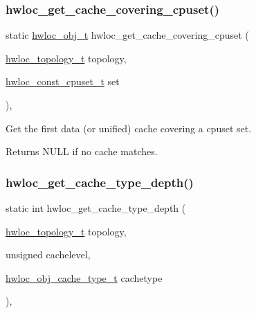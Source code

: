 \subsubsection{\texorpdfstring{hwloc\+\_\+get\+\_\+cache\+\_\+covering\+\_\+cpuset()}{hwloc\_get\_cache\_covering\_cpuset()}}
{\footnotesize\ttfamily static \hyperlink{a00185_ga79b8ab56877ef99ac59b833203391c7d}{hwloc\+\_\+obj\+\_\+t} hwloc\+\_\+get\+\_\+cache\+\_\+covering\+\_\+cpuset (\begin{DoxyParamCaption}\item[{\hyperlink{a00186_ga9d1e76ee15a7dee158b786c30b6a6e38}{hwloc\+\_\+topology\+\_\+t}}]{topology,  }\item[{\hyperlink{a00183_ga1f784433e9b606261f62d1134f6a3b25}{hwloc\+\_\+const\+\_\+cpuset\+\_\+t}}]{set }\end{DoxyParamCaption})\hspace{0.3cm}{\ttfamily [inline]}, {\ttfamily [static]}}



Get the first data (or unified) cache covering a cpuset {\ttfamily set}. 

\begin{DoxyReturn}{Returns}
{\ttfamily N\+U\+LL} if no cache matches. 
\end{DoxyReturn}
\mbox{\label{a00199_gad108a09ce400222fe45545257d575489}} 
\subsubsection{\texorpdfstring{hwloc\+\_\+get\+\_\+cache\+\_\+type\+\_\+depth()}{hwloc\_get\_cache\_type\_depth()}}
{\footnotesize\ttfamily static int hwloc\+\_\+get\+\_\+cache\+\_\+type\+\_\+depth (\begin{DoxyParamCaption}\item[{\hyperlink{a00186_ga9d1e76ee15a7dee158b786c30b6a6e38}{hwloc\+\_\+topology\+\_\+t}}]{topology,  }\item[{unsigned}]{cachelevel,  }\item[{\hyperlink{a00184_gab6e1e7efedae8b341f3ee14fbe53d66c}{hwloc\+\_\+obj\+\_\+cache\+\_\+type\+\_\+t}}]{cachetype }\end{DoxyParamCaption})\hspace{0.3cm}{\ttfamily [inline]}, {\ttfamily [static]}}



